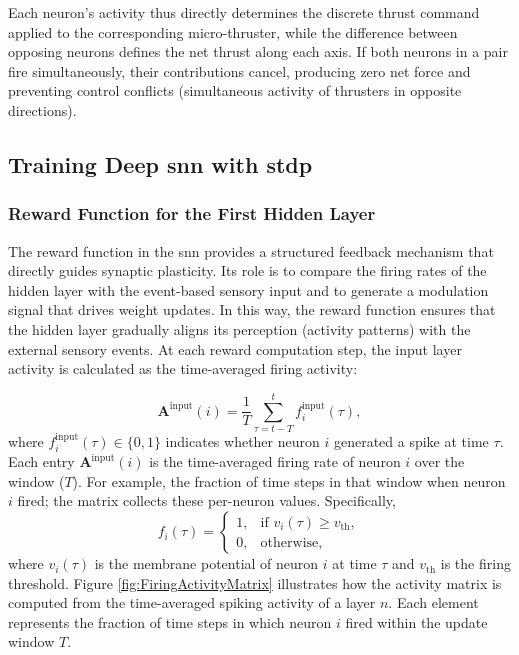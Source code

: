 Each neuron’s activity thus directly determines the discrete thrust command applied to the corresponding micro-thruster, while the difference between opposing neurons defines the net thrust along each axis. If both neurons in a pair fire simultaneously, their contributions cancel, producing zero net force and preventing control conflicts (simultaneous activity of thrusters in opposite directions).



\subsection{Training Deep \ac{snn} with \ac{stdp}}

\subsubsection{Reward Function for the First Hidden Layer}
\label{FirstLayerTraining}

The reward function in the \ac{snn} provides a structured feedback mechanism that directly guides synaptic plasticity. Its role is to compare the firing rates of the hidden layer with the event-based sensory input and to generate a modulation signal that drives weight updates. In this way, the reward function ensures that the hidden layer gradually aligns its perception (activity patterns) with the external sensory events. At each reward computation step, the input layer activity is calculated as the time-averaged firing activity:

\begin{equation}
\mathbf{A}^{\text{input}}(i) = \frac{1}{T} \sum_{\tau=t-T}^{t} f_i^{\text{input}}(\tau),
\label{eq:inputActivityMatrix}
\end{equation}
where \( f_i^{\text{input}}(\tau) \in \{0,1\} \) indicates whether neuron \( i \) generated a spike at time \(\tau\). Each entry \(\mathbf{A}^{\text{input}}(i)\) is the time-averaged firing rate of neuron \( i \) over the window ($T$). For example, the fraction of time steps in that window when neuron \( i \) fired; the matrix collects these per-neuron values.
Specifically, 
\begin{equation}
f_i(\tau) =
\begin{cases}
1, & \text{if } v_i(\tau) \geq v_{\text{th}}, \\
0, & \text{otherwise},
\end{cases}
\end{equation}
where \( v_i(\tau) \) is the membrane potential of neuron \( i \) at time \(\tau\) and \( v_{\text{th}} \) is the firing threshold. Figure \ref{fig:FiringActivityMatrix} illustrates how the activity matrix is computed from the time-averaged spiking activity of a layer $n$. Each element represents the fraction of time steps in which neuron \( i \) fired within the update window $T$.

